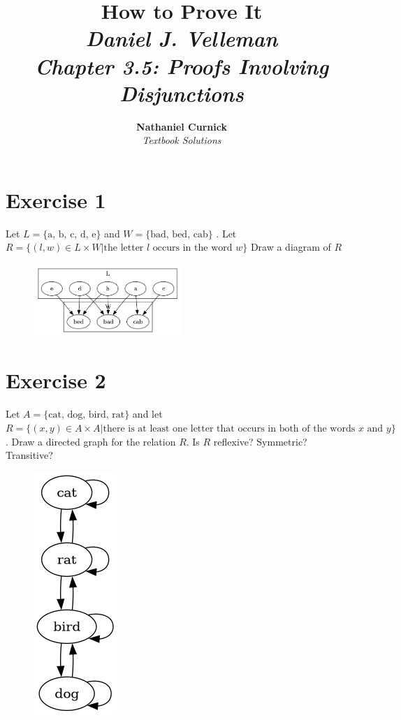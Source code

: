\documentclass[11pt]{article}
\title{\textbf{How to Prove It} \\ {\Large\itshape Daniel J. Velleman} \\ {\Large\itshape Chapter 3.5: Proofs Involving Disjunctions}}
\author{\textbf{Nathaniel Curnick} \\ \textit{Textbook Solutions}}
\date{}
\begin{document}
\maketitle

\section*{Exercise 1}

Let $L = \{ \text{a, b, c, d, e} \}$ and $W = \{ \text{bad, bed, cab} \}$ .
Let $R = \{ (l, w) \in L \times W | \text{the letter } l \text{ occurs in the word } w \}$
Draw a diagram of $R$

\begin{figure}[H]
\includegraphics[width=0.5\textwidth]{4_3_images/4_3_1.png}
\end{figure}

\section*{Exercise 2}

Let $A = \{ \text{cat, dog, bird, rat} \}$ and let 
$R = \{(x, y) \in A \times A | \text{there is at least one letter that occurs in both of the words } x \text{ and } y \}$.
Draw a directed graph for the relation $R$. Is $R$ reflexive? Symmetric? Transitive?

\begin{figure}[H]
\includegraphics[height=0.25\textheight]{4_3_images/4_3_2.png}
\end{figure}
\end{document}
